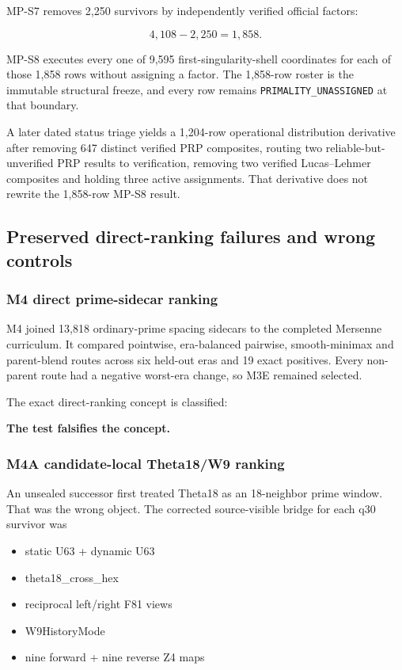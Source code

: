 MP-S7 removes 2,250 survivors by independently verified official
factors:

\[
4{,}108-2{,}250=1{,}858.
\]

MP-S8 executes every one of 9,595 first-singularity-shell coordinates
for each of those 1,858 rows without assigning a factor. The 1,858-row
roster is the immutable structural freeze, and every row remains
\texttt{PRIMALITY\_UNASSIGNED} at that boundary.

A later dated status triage yields a 1,204-row operational distribution
derivative after removing 647 distinct verified PRP composites, routing
two reliable-but-unverified PRP results to verification, removing two
verified Lucas--Lehmer composites and holding three active assignments.
That derivative does not rewrite the 1,858-row MP-S8 result.

\subsection{Preserved direct-ranking failures and wrong
controls}\label{viii-ch10-preserved-direct-ranking-failures-and-wrong-controls}

\subsubsection{M4 direct prime-sidecar
ranking}\label{viii-ch10-m4-direct-prime-sidecar-ranking}

M4 joined 13,818 ordinary-prime spacing sidecars to the completed
Mersenne curriculum. It compared pointwise, era-balanced pairwise,
smooth-minimax and parent-blend routes across six held-out eras and 19
exact positives. Every non-parent route had a negative worst-era change,
so M3E remained selected.

The exact direct-ranking concept is classified:

\textbf{The test falsifies the concept.}

\subsubsection{M4A candidate-local Theta18/W9
ranking}\label{viii-ch10-m4a-candidate-local-theta18w9-ranking}

An unsealed successor first treated Theta18 as an 18-neighbor prime
window. That was the wrong object. The corrected source-visible bridge
for each q30 survivor was

\begin{itemize}
\tightlist
\item
  static U63 + dynamic U63
\item
  theta18\_cross\_hex
\item
  reciprocal left/right F81 views
\item
  W9HistoryMode
\item
  nine forward + nine reverse Z4 maps
\end{itemize}

